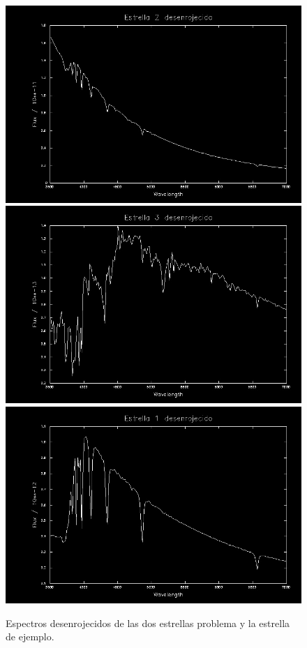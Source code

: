 \documentclass{aa} %
\begin{document}
\begin{figure}[h!]
\begin{center}
\includegraphics[scale=0.15]{2 desenrojecido.png}
\includegraphics[scale=0.15]{3 desenrojecido.png}
\includegraphics[scale=0.15]{1 desenrojecido.png}
\caption{Espectros desenrojecidos de las dos estrellas problema y la estrella de ejemplo.}
\label{fig:desenrojecidos}
\end{center}
\end{figure}
\end{document}

